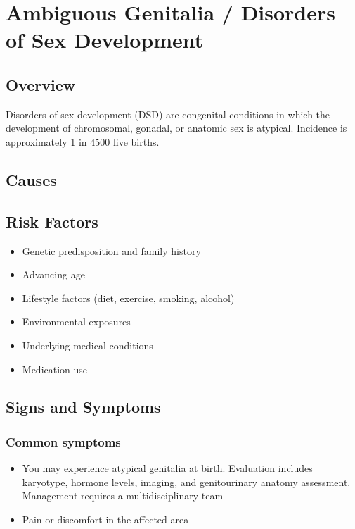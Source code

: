 \chapter{Ambiguous Genitalia / Disorders of Sex Development}
\label{sec:Ambiguous Genitalia}

\section{Overview}
Disorders of sex development (DSD) are congenital conditions in which the development of chromosomal, gonadal, or anatomic sex is atypical. Incidence is approximately 1 in 4500 live births.
\section{Causes}
\section{Risk Factors}

\begin{itemize}[noitemsep]
  \item Genetic predisposition and family history
  \item Advancing age
  \item Lifestyle factors (diet, exercise, smoking, alcohol)
  \item Environmental exposures
  \item Underlying medical conditions
  \item Medication use
\end{itemize}
\section{Signs and Symptoms}

\subsection{Common symptoms}
\begin{itemize}[noitemsep]
  \item You may experience atypical genitalia at birth. Evaluation includes karyotype, hormone levels, imaging, and genitourinary anatomy assessment. Management requires a multidisciplinary team

  \item Pain or discomfort in the affected area
  \end{itemize}

